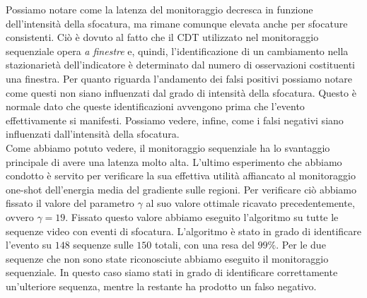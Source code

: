 Possiamo notare come la latenza del monitoraggio decresca in funzione dell'intensit\`a della sfocatura, ma rimane comunque elevata anche per sfocature consistenti.
Ci\`o \`e dovuto al fatto che il CDT utilizzato nel monitoraggio sequenziale opera \textit{a finestre} e, quindi, l'identificazione di un cambiamento nella stazionariet\`a dell'indicatore \`e determinato dal numero di osservazioni costituenti una finestra.
Per quanto riguarda l'andamento dei falsi positivi possiamo notare come questi non siano influenzati dal grado di intensit\`a della sfocatura.
Questo \`e normale dato che queste identificazioni avvengono prima che l'evento effettivamente si manifesti. 
Possiamo vedere, infine, come i falsi negativi siano influenzati dall'intensit\`a della sfocatura. \\
Come abbiamo potuto vedere, il monitoraggio sequenziale ha lo svantaggio principale di avere una latenza molto alta.
L'ultimo esperimento che abbiamo condotto \`e servito per verificare la sua effettiva utilit\`a affiancato al monitoraggio one-shot dell'energia media del gradiente sulle regioni.
Per verificare ci\`o abbiamo fissato il valore del parametro $\gamma$ al suo valore ottimale ricavato precedentemente, ovvero $\gamma=19$.
Fissato questo valore abbiamo eseguito l'algoritmo su tutte le sequenze video con eventi di sfocatura.
L'algoritmo \`e stato in grado di identificare l'evento su $148$ sequenze sulle $150$ totali, con una resa del $99\%$. 
Per le due sequenze che non sono state riconosciute abbiamo eseguito il monitoraggio sequenziale.
In questo caso siamo stati in grado di identificare correttamente un'ulteriore sequenza, mentre la restante ha prodotto un falso negativo. 
